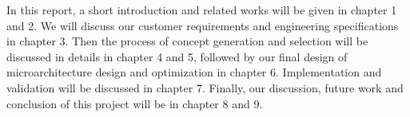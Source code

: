 In this report, a short introduction and related works will be given in chapter 1 and 2. We will discuss our customer requirements and engineering specifications in chapter 3. Then the process of concept generation and selection will be discussed in details in chapter 4 and 5, followed by our final design of microarchitecture design and optimization in chapter 6. Implementation and validation will be discussed in chapter 7. Finally, our discussion, future work and conclusion of this project will be in chapter 8 and 9.
